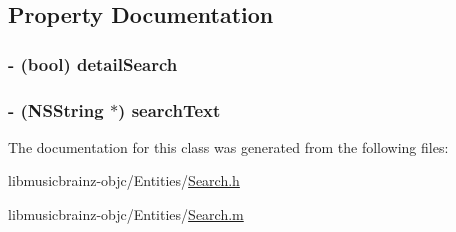 \subsection{Property Documentation}
\hypertarget{interface_search_aabe1a30087c58839cafb877e79348df1}{
\subsubsection[{detail\-Search}]{\setlength{\rightskip}{0pt plus 5cm}-\/ (bool) {\bf detail\-Search}}}\label{interface_search_aabe1a30087c58839cafb877e79348df1}
\hypertarget{interface_search_a6966d081462b1fd02c8e9a6441f12e1b}{
\subsubsection[{search\-Text}]{\setlength{\rightskip}{0pt plus 5cm}-\/ (N\-S\-String $\ast$) {\bf search\-Text}}}\label{interface_search_a6966d081462b1fd02c8e9a6441f12e1b}


The documentation for this class was generated from the following files\-:\begin{DoxyCompactItemize}
\item 
libmusicbrainz-\/objc/\-Entities/\hyperlink{_search_8h}{Search.\-h}\item 
libmusicbrainz-\/objc/\-Entities/\hyperlink{_search_8m}{Search.\-m}\end{DoxyCompactItemize}
